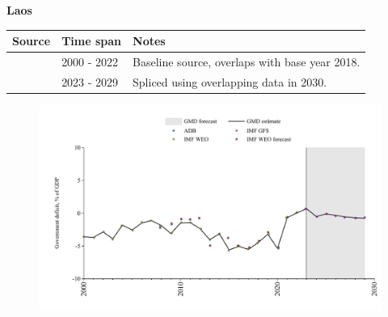 \documentclass[12pt,a4paper,landscape]{article}
\begin{document}
\begin{adjustbox}{max totalsize={\paperwidth}{\paperheight},center}
\begin{minipage}[t][\textheight][t]{\textwidth}
\vspace*{0.5cm}
{}
\begin{center}
{\Large\bfseries Laos}
\end{center}
\vspace{0.5cm}
\begin{table}[H]
\centering
\small
\begin{tabular}{|l|l|l|}
\hline
\textbf{Source} & \textbf{Time span} & \textbf{Notes} \\
\hline
\rowcolor{white}\cite{IMF_WEO}& 2000 - 2022 &Baseline source, overlaps with base year 2018.\\
\rowcolor{lightgray}\cite{IMF_WEO_forecast}& 2023 - 2029 &Spliced using overlapping data in 2030.\\
\hline
\end{tabular}
\end{table}
\begin{figure}[H]
\centering
\includegraphics[width=\textwidth,height=0.6\textheight,keepaspectratio]{graphs/LAO_govdef_GDP.pdf}
\end{figure}
\end{minipage}
\end{adjustbox}
\end{document}
